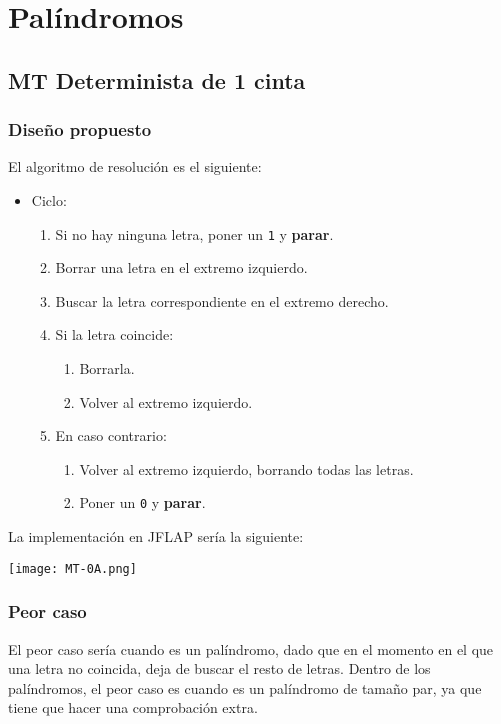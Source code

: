 \section{Palíndromos}

\subsection{MT Determinista de 1 cinta}

\subsubsection*{Diseño propuesto}
El algoritmo de resolución es el siguiente:

\begin{itemize}
    \item Ciclo:
    \begin{enumerate}[1.]
        \item Si no hay ninguna letra, poner un \texttt{1} y \textbf{parar}.
        \item Borrar una letra en el extremo izquierdo.
        \item Buscar la letra correspondiente en el extremo derecho.
        \item Si la letra coincide:
        \begin{enumerate}[1.]
            \item Borrarla.
            \item Volver al extremo izquierdo.
        \end{enumerate}
        \item En caso contrario:
        \begin{enumerate}[1.]
            \item Volver al extremo izquierdo, borrando todas las letras.
            \item Poner un \texttt{0} y \textbf{parar}.
        \end{enumerate}
    \end{enumerate}
\end{itemize}

La implementación en JFLAP sería la siguiente:

\texttt{[image: MT-0A.png]}


\subsubsection*{Peor caso}
El peor caso sería cuando es un palíndromo, dado que en el momento en el que una letra no coincida, deja de buscar el resto de letras. Dentro de los palíndromos, el peor caso es cuando es un palíndromo de tamaño par, ya que tiene que hacer una comprobación extra.

